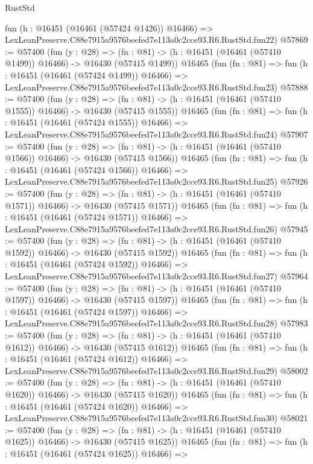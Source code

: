 \begin{lexlean}{RustStd}
\begin{coremodule}
    fun (h : @16451 (@16461 (@57424 @1426)) @16466) =>
    LexLeanPreserve.C88e7915a9576beefed7e113a0c2cce93.R6.RustStd.fun22)
@57869 := @57400
    (fun (y : @28) =>
    (fn : @81) -> (h : @16451 (@16461 (@57410 @1499)) @16466) -> @16430 (@57415 @1499))
    @16465
    (fun (fn : @81) =>
    fun (h : @16451 (@16461 (@57424 @1499)) @16466) =>
    LexLeanPreserve.C88e7915a9576beefed7e113a0c2cce93.R6.RustStd.fun23)
@57888 := @57400
    (fun (y : @28) =>
    (fn : @81) -> (h : @16451 (@16461 (@57410 @1555)) @16466) -> @16430 (@57415 @1555))
    @16465
    (fun (fn : @81) =>
    fun (h : @16451 (@16461 (@57424 @1555)) @16466) =>
    LexLeanPreserve.C88e7915a9576beefed7e113a0c2cce93.R6.RustStd.fun24)
@57907 := @57400
    (fun (y : @28) =>
    (fn : @81) -> (h : @16451 (@16461 (@57410 @1566)) @16466) -> @16430 (@57415 @1566))
    @16465
    (fun (fn : @81) =>
    fun (h : @16451 (@16461 (@57424 @1566)) @16466) =>
    LexLeanPreserve.C88e7915a9576beefed7e113a0c2cce93.R6.RustStd.fun25)
@57926 := @57400
    (fun (y : @28) =>
    (fn : @81) -> (h : @16451 (@16461 (@57410 @1571)) @16466) -> @16430 (@57415 @1571))
    @16465
    (fun (fn : @81) =>
    fun (h : @16451 (@16461 (@57424 @1571)) @16466) =>
    LexLeanPreserve.C88e7915a9576beefed7e113a0c2cce93.R6.RustStd.fun26)
@57945 := @57400
    (fun (y : @28) =>
    (fn : @81) -> (h : @16451 (@16461 (@57410 @1592)) @16466) -> @16430 (@57415 @1592))
    @16465
    (fun (fn : @81) =>
    fun (h : @16451 (@16461 (@57424 @1592)) @16466) =>
    LexLeanPreserve.C88e7915a9576beefed7e113a0c2cce93.R6.RustStd.fun27)
@57964 := @57400
    (fun (y : @28) =>
    (fn : @81) -> (h : @16451 (@16461 (@57410 @1597)) @16466) -> @16430 (@57415 @1597))
    @16465
    (fun (fn : @81) =>
    fun (h : @16451 (@16461 (@57424 @1597)) @16466) =>
    LexLeanPreserve.C88e7915a9576beefed7e113a0c2cce93.R6.RustStd.fun28)
@57983 := @57400
    (fun (y : @28) =>
    (fn : @81) -> (h : @16451 (@16461 (@57410 @1612)) @16466) -> @16430 (@57415 @1612))
    @16465
    (fun (fn : @81) =>
    fun (h : @16451 (@16461 (@57424 @1612)) @16466) =>
    LexLeanPreserve.C88e7915a9576beefed7e113a0c2cce93.R6.RustStd.fun29)
@58002 := @57400
    (fun (y : @28) =>
    (fn : @81) -> (h : @16451 (@16461 (@57410 @1620)) @16466) -> @16430 (@57415 @1620))
    @16465
    (fun (fn : @81) =>
    fun (h : @16451 (@16461 (@57424 @1620)) @16466) =>
    LexLeanPreserve.C88e7915a9576beefed7e113a0c2cce93.R6.RustStd.fun30)
@58021 := @57400
    (fun (y : @28) =>
    (fn : @81) -> (h : @16451 (@16461 (@57410 @1625)) @16466) -> @16430 (@57415 @1625))
    @16465
    (fun (fn : @81) =>
    fun (h : @16451 (@16461 (@57424 @1625)) @16466) =>

\end{coremodule}
\end{lexlean}
